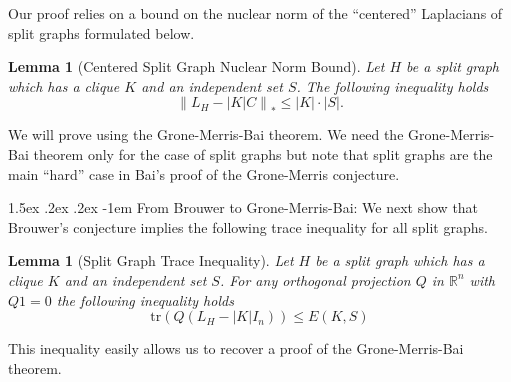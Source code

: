 \documentclass[10pt,reqno]{amsart}
\makeatletter
\renewcommand\paragraph{\@startsection{paragraph}{4}{\z@}%
  {1.5ex \@plus .2ex \@minus .2ex}%
  {-1em}%
  {\normalfont\normalsize\bfseries}}
\newtheorem{lemma}[theorem]{Lemma}
\theoremstyle{definition}
\theoremstyle{remark}
\numberwithin{equation}{section}
\newcommand{\R}{\mathbb{R}}
\newcommand{\tr}{\text{tr} }
\newcommand{\norm}[1]{\left\| #1 \right\|}
\makeatother
\begin{document}
Our proof relies on a bound on the nuclear norm of the ``centered'' Laplacians of split graphs formulated below.    %



\begin{lemma}[Centered Split Graph Nuclear Norm Bound]\label{lem:nuclearnormresult}
    Let $H$ be a split graph which has a clique $K$ and an independent set $S$. The following inequality holds
    $$\norm{L_H-|K|C}_*\le |K|\cdot |S|.$$
\end{lemma}

We will prove  using the Grone-Merris-Bai theorem. We need the Grone-Merris-Bai theorem only for the case of split graphs but note that split graphs are the main ``hard'' case in Bai's proof of the Grone-Merris conjecture.



\paragraph{From Brouwer to Grone-Merris-Bai:} We next show that Brouwer's conjecture implies the following trace inequality for all split graphs.  

\begin{lemma}[Split Graph Trace Inequality]\label{lem:traceresult}
    Let $H$ be a split graph which has a clique $K$ and an independent set $S$. For any orthogonal projection $Q$ in $\R^n$ with $Q1=0$ the following inequality holds
    $$\mathrm{\tr} \left (Q(L_H-|K|I_n)\right )\le E(K,S)$$
\end{lemma}

This inequality easily allows us to recover a proof of the Grone-Merris-Bai theorem. 
\end{document}
